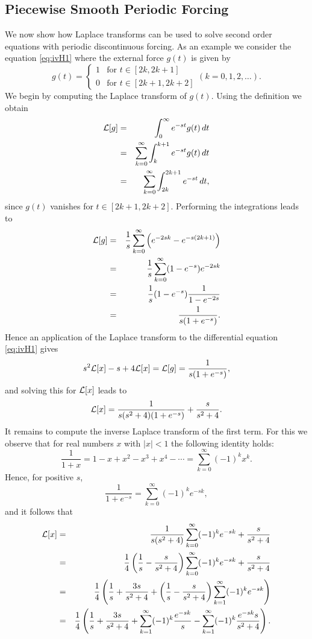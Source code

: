 \documentclass{ximera}
\begin{document}
\subsection*{Piecewise Smooth Periodic Forcing}

We now show how Laplace transforms can be used to solve second order
equations with periodic discontinuous forcing.  As an example we consider
the equation \eqref{eq:ivH1} where the external force $g(t)$ is
given by
\begin{equation}
g(t) =  
\left\{\begin{array}{cl} 1 & \mbox{for $t \in [2k,2k+1]$} \\ 
		0 & \mbox{for $t \in [2k+1,2k+2]$} \end{array} \right.
(k=0,1,2,\ldots).
\end{equation}
We begin by computing the Laplace transform of $g(t)$. Using the 
definition we obtain
\begin{eqnarray*}
{\cal L}[g] & = & \int_0^\infty e^{-st} g(t)\, dt\\
&=& \sum_{k=0}^\infty \int_k^{k+1} e^{-st} g(t)\, dt\\
&=& \sum_{k=0}^\infty \int_{2k}^{2k+1} e^{-st}\, dt,
\end{eqnarray*}
since $g(t)$ vanishes for $t \in [2k+1,2k+2]$. Performing the
integrations leads to
\begin{eqnarray*}
{\cal L}[g] & = & \frac{1}{s}\sum_{k=0}^\infty \left(e^{-2sk}-e^{-s(2k+1)}\right)\\
&=& \frac{1}{s}\sum_{k=0}^\infty (1-e^{-s})e^{-2sk}\\
&=& \frac{1}{s} (1-e^{-s}) \frac{1}{1-e^{-2s}}\\
&=& \frac{1}{s(1+e^{-s})}.
\end{eqnarray*}
Hence an application of the Laplace transform to the differential equation 
\eqref{eq:ivH1} gives
\[
s^2{\cal L}[x]-s + 4{\cal L}[x] = {\cal L}[g] = \frac{1}{s(1+e^{-s})},
\]
and solving this for ${\cal L}[x]$ leads to
\[
{\cal L}[x] = \frac{1}{s(s^2 +4)(1+e^{-s})} + \frac{s}{s^2 +4}.
\]
It remains to compute the inverse Laplace transform 
of the first term.  For this
we observe that for real numbers $x$ with $|x|<1$ the following identity holds:
\[
\frac{1}{1+x} = 1-x+x^2-x^3+x^4-\cdots = \sum_{k=0}^\infty (-1)^k x^k.
\]
Hence, for positive $s$,
\[
\frac{1}{1+e^{-s}} = \sum_{k=0}^\infty (-1)^k e^{-sk},
\]
and it follows that
\begin{eqnarray*}
{\cal L}[x] &=&\frac{1}{s(s^2 +4)}\sum_{k=0}^\infty (-1)^k e^{-sk} + \frac{s}{s^2 +4}\\
&=& \frac{1}{4}\left(\frac{1}{s}-\frac{s}{s^2+4}\right)
    \sum_{k=0}^\infty (-1)^k e^{-sk} + \frac{s}{s^2 +4}\\
&=& \frac{1}{4}\left(\frac{1}{s}+\frac{3s}{s^2+4}+
   \left(\frac{1}{s}-\frac{s}{s^2+4}\right) \sum_{k=1}^\infty (-1)^k e^{-sk}\right)\\
&=& \frac{1}{4}\left(\frac{1}{s}+\frac{3s}{s^2+4}+
   \sum_{k=1}^\infty (-1)^k \frac{e^{-sk}}{s}-
   \sum_{k=1}^\infty (-1)^k \frac{e^{-sk}s}{s^2+4}\right).
\end{eqnarray*} 
\end{document}
